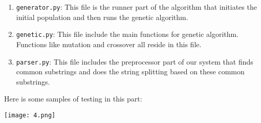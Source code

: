 \documentclass{solutionclass} %
\begin{document}
\begin{solution}
\begin{enumerate}
\item \verb*|generator.py|: This file is the runner part of the algorithm that initiates the initial population and then runs the genetic algorithm.

\item \verb*|genetic.py|: This file include the main functions for genetic algorithm. Functions like mutation and crossover all reside in this file.

\item \verb*|parser.py|: This file includes the preprocessor part of our system that finds common substrings and does the string splitting based on these common substrings.

\end{enumerate}

Here is some samples of testing in this part:
\end{solution}

\begin{center}
  \texttt{[image: 4.png]}
\end{center}

    \thispagestyle{fancyplain}
    \fancyhead{}
    \renewcommand{\headrulewidth}{0pt}
\end{document}
